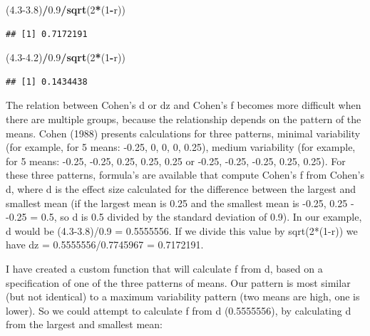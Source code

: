 \documentclass[]{book}
\newenvironment{Shaded}{\begin{snugshade}}{\end{snugshade}}
\newcommand{\DataTypeTok}[1]{\textcolor[rgb]{0.13,0.29,0.53}{#1}}
\newcommand{\DecValTok}[1]{\textcolor[rgb]{0.00,0.00,0.81}{#1}}
\newcommand{\FloatTok}[1]{\textcolor[rgb]{0.00,0.00,0.81}{#1}}
\newcommand{\KeywordTok}[1]{\textcolor[rgb]{0.13,0.29,0.53}{\textbf{#1}}}
\newcommand{\NormalTok}[1]{#1}
\newcommand{\OperatorTok}[1]{\textcolor[rgb]{0.81,0.36,0.00}{\textbf{#1}}}
\newcommand{\StringTok}[1]{\textcolor[rgb]{0.31,0.60,0.02}{#1}}
\begin{document}
\begin{Shaded}
\begin{Highlighting}[]
\NormalTok{(}\FloatTok{4.3-3.8}\NormalTok{)}\OperatorTok{/}\FloatTok{0.9}\OperatorTok{/}\KeywordTok{sqrt}\NormalTok{(}\DecValTok{2}\OperatorTok{*}\NormalTok{(}\DecValTok{1}\OperatorTok{-}\NormalTok{r))}
\end{Highlighting}
\end{Shaded}

\begin{verbatim}
## [1] 0.7172191
\end{verbatim}

\begin{Shaded}
\begin{Highlighting}[]
\NormalTok{(}\FloatTok{4.3-4.2}\NormalTok{)}\OperatorTok{/}\FloatTok{0.9}\OperatorTok{/}\KeywordTok{sqrt}\NormalTok{(}\DecValTok{2}\OperatorTok{*}\NormalTok{(}\DecValTok{1}\OperatorTok{-}\NormalTok{r))}
\end{Highlighting}
\end{Shaded}

\begin{verbatim}
## [1] 0.1434438
\end{verbatim}

The relation between Cohen's d or dz and Cohen's f becomes more difficult when there are multiple groups, because the relationship depends on the pattern of the means. Cohen (1988) presents calculations for three patterns, minimal variability (for example, for 5 means: -0.25, 0, 0, 0, 0.25), medium variability (for example, for 5 means: -0.25, -0.25, 0.25, 0.25, 0.25 or -0.25, -0.25, -0.25, 0.25, 0.25). For these three patterns, formula's are available that compute Cohen's f from Cohen's d, where d is the effect size calculated for the difference between the largest and smallest mean (if the largest mean is 0.25 and the smallest mean is -0.25, 0.25 - -0.25 = 0.5, so d is 0.5 divided by the standard deviation of 0.9). In our example, d would be (4.3-3.8)/0.9 = 0.5555556. If we divide this value by sqrt(2*(1-r)) we have dz = 0.5555556/0.7745967 = 0.7172191.

I have created a custom function that will calculate f from d, based on a specification of one of the three patterns of means. Our pattern is most similar (but not identical) to a maximum variability pattern (two means are high, one is lower). So we could attempt to calculate f from d (0.5555556), by calculating d from the largest and smallest mean:

\begin{Shaded}
\end{Shaded}
\end{document}
